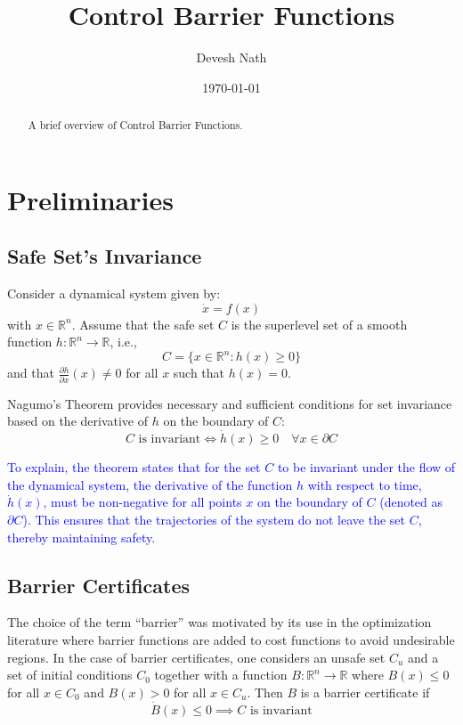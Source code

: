 \documentclass[12pt]{article}
\begin{document}
\title{Control Barrier Functions}
\author{Devesh Nath}
\date{\today}

\setlength{\parindent}{0pt} %
\setlength{\parskip}{\baselineskip} %

\maketitle

\begin{abstract}
\begin{center}
A brief overview of Control Barrier Functions.
\end{center}
\end{abstract}

\section{Preliminaries}
\subsection{Safe Set's Invariance}
Consider a dynamical system given by:
\[
\dot{x} = f(x)
\]
with \( x \in \mathbb{R}^n \). Assume that the safe set \( C \) is the superlevel set of a smooth function \( h : \mathbb{R}^n \to \mathbb{R} \), i.e.,
\[
C = \{ x \in \mathbb{R}^n : h(x) \geq 0 \}
\]
and that \( \frac{\partial h}{\partial x} (x) \neq 0 \) for all \( x \) such that \( h(x) = 0 \). 

Nagumo’s Theorem provides necessary and sufficient conditions for set invariance based on the derivative of \( h \) on the boundary of \( C \):
\[
C \text{ is invariant} \iff \dot{h}(x) \geq 0 \quad \forall x \in \partial C
\]

\textcolor{blue}{
To explain, the theorem states that for the set \( C \) to be invariant under the flow of the dynamical system, the derivative of the function \( h \) with respect to time, \( \dot{h}(x) \), must be non-negative for all points \( x \) on the boundary of \( C \) (denoted as \( \partial C \)). This ensures that the trajectories of the system do not leave the set \( C \), thereby maintaining safety.
}

\subsection{Barrier Certificates}
The choice of the term “barrier” was motivated by its use in the optimization literature where barrier functions are added to cost functions to avoid undesirable regions. In the case of barrier certificates, one considers an unsafe set \( C_u \) and a set of initial conditions \( C_0 \) together with a function \( B : \mathbb{R}^n \to \mathbb{R} \) where \( B(x) \leq 0 \) for all \( x \in C_0 \) and \( B(x) > 0 \) for all \( x \in C_u \). Then \( B \) is a barrier certificate if
\[
\dot{B}(x) \leq 0 \implies C \text{ is invariant}
\]
\end{document}
